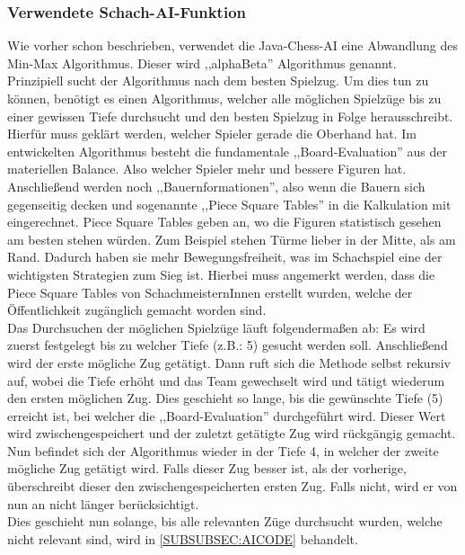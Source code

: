 \documentclass[12pt,a4paper]{article}
\begin{document}
{\subsubsection{Verwendete Schach-AI-Funktion}
\label{SUBSUBSEC:OurAI}

Wie vorher schon beschrieben, verwendet die Java-Chess-AI eine Abwandlung des Min-Max Algorithmus. Dieser wird ,,alphaBeta'' Algorithmus genannt. \\
Prinzipiell sucht der Algorithmus nach dem besten Spielzug. Um dies tun zu können, benötigt es einen Algorithmus, welcher alle möglichen Spielzüge bis zu einer gewissen Tiefe durchsucht und den besten Spielzug in Folge herausschreibt. \\ 
Hierfür muss geklärt werden, welcher Spieler gerade die Oberhand hat. Im entwickelten Algorithmus besteht die fundamentale ,,Board-Evaluation'' aus der materiellen Balance. Also welcher Spieler mehr und bessere Figuren hat. Anschließend werden noch  ,,Bauernformationen'', also wenn die Bauern sich gegenseitig decken und sogenannte ,,Piece Square Tables'' in die Kalkulation mit eingerechnet. Piece Square Tables geben an, wo die Figuren statistisch gesehen am besten stehen würden. Zum Beispiel stehen Türme lieber in der Mitte, als am Rand. Dadurch haben sie mehr Bewegungsfreiheit, was im Schachspiel eine der wichtigsten Strategien zum Sieg ist. Hierbei muss angemerkt werden, dass die Piece Square Tables von SchachmeisternInnen erstellt wurden, welche der Öffentlichkeit zugänglich gemacht worden sind.\cite{SquareTables} \\[2ex]
Das Durchsuchen der möglichen Spielzüge läuft folgendermaßen ab: Es wird zuerst festgelegt bis zu welcher Tiefe (z.B.: 5) gesucht werden soll. Anschließend wird der erste mögliche Zug getätigt. Dann ruft sich die Methode selbst rekursiv auf, wobei die Tiefe erhöht und das Team gewechselt wird und tätigt wiederum den ersten möglichen Zug. Dies geschieht so lange, bis die gewünschte Tiefe (5) erreicht ist, bei welcher die ,,Board-Evaluation'' durchgeführt wird. Dieser Wert wird zwischengespeichert und der zuletzt getätigte Zug wird rückgängig gemacht. \\
Nun befindet sich der Algorithmus wieder in der Tiefe 4, in welcher der zweite mögliche Zug getätigt wird. Falls dieser Zug besser ist, als der vorherige, überschreibt dieser den zwischengespeicherten ersten Zug. Falls nicht, wird er von nun an nicht länger berücksichtigt. \\
Dies geschieht nun solange, bis alle relevanten Züge durchsucht wurden, welche nicht relevant sind, wird in \ref{SUBSUBSEC:AICODE} behandelt. \\
}
\end{document}
